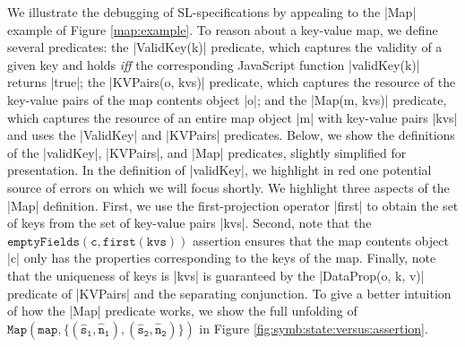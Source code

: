 We illustrate the debugging of SL-specifications by appealing to the \jsinline|Map| example of Figure \ref{map:example}. To reason about a key-value map,
we define several predicates: 
 the \jsinline|ValidKey(k)| predicate, which captures the validity of a given key and holds \emph{iff} the corresponding JavaScript function \jsinline|validKey(k)| returns \jsinline|true|;
 the \jsinline|KVPairs(o, kvs)| predicate, which captures the resource of the key-value pairs of the map contents object \jsinline|o|; and
 the \jsinline|Map(m, kvs)| predicate, which captures the resource of an entire map object \jsinline|m| with key-value pairs \jsinline|kvs| and uses the \jsinline|ValidKey| and \jsinline|KVPairs| predicates.
Below, we show the definitions of the \jsinline|validKey|, \jsinline|KVPairs|, and \jsinline|Map| predicates, slightly simplified for presentation. 
In the definition of \jsinline|validKey|, we highlight in red one potential source of errors on which we will focus shortly. 
%
We highlight three aspects of the \jsinline|Map| definition. 
First, we use the first-projection operator \jsinline|first| to obtain the set of keys from the set of key-value pairs \jsinline|kvs|. 
Second, note that the {\small $\mathtt{emptyFields(c, first(kvs))}$} assertion ensures that the map contents object \jsinline|c| only has the properties corresponding to the keys of the map. 
Finally, note that the uniqueness of keys is \jsinline|kvs| is guaranteed by the \jsinline|DataProp(o, k, v)| predicate of \jsinline|KVPairs| and the separating conjunction.
To give a better intuition of how the \jsinline|Map| predicate works, we show the full unfolding of {\small$\mathtt{Map(map, \{ (\hat{s}_1, \hat{n}_1), (\hat{s}_2, \hat{n}_2) \} )}$} in Figure \ref{fig:symb:state:versus:assertion}.


